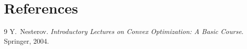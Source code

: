 \documentclass{article}
\begin{document}
\section*{References}
\begin{thebibliography}{9}
Y.~Nesterov.
\newblock \emph{Introductory Lectures on Convex Optimization: A Basic
  Course}.
\newblock Springer, 2004.
\end{thebibliography}
\end{document}
